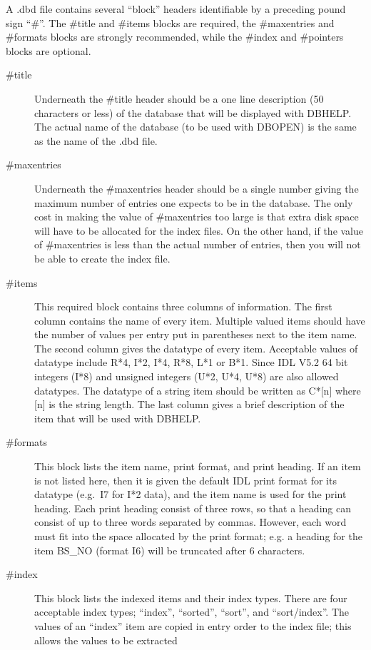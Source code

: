 A .dbd file contains several ``block'' headers identifiable by a 
preceding pound sign ``\#''.  The \#title and \#items blocks are
required, the \#maxentries and \#formats blocks are strongly recommended,
while the \#index and \#pointers blocks are optional.
\begin{description}
\item [\#title] Underneath the \#title header should be a one line description
(50 characters or less) of the database that will be displayed with
DBHELP.  The actual name of the database (to be used with DBOPEN) is the
same as the name of the .dbd file.   
\item [\#maxentries] Underneath the \#maxentries header should be a single
number giving the maximum number of entries one expects to be in the database.
The only cost in making the value of \#maxentries too large is that extra
disk space will have to be allocated for the index files.   On the other
hand, if the value of \#maxentries is less than the actual number of entries,   
then you will not be able to create the index file.
\item [\#items]  This required block contains three columns of information.
The first column contains the name of every item.  Multiple valued items
should have the number of values per entry put in parentheses next to the
item name.
The second column
gives the datatype of every item.  Acceptable values of datatype include
R*4, I*2, I*4, R*8, L*1 or B*1.   Since IDL V5.2 64 bit integers (I*8) and
unsigned integers (U*2, U*4, U*8) are also allowed datatypes. The datatype 
of a string item should be
written as C*[n] where [n] is the string length.  The last column
gives a brief description of the item that will be used with DBHELP.
\item [\#formats] This block lists the item name, print format, and print
heading.  If an item is not listed here, then it is given the default
IDL print format for its datatype (e.g.\ I7 for I*2 data), and the item
name is used for the print heading.  Each print heading consist of three
rows, so that a heading can consist of up to three words separated by
commas.   However, each word must fit into the space allocated by the
print format; e.g. a heading for the item BS\_NO (format I6) will be
truncated after 6 characters.
\item [\#index]  
This block lists the indexed items and their index types.    
There are four acceptable index types; ``index'', ``sorted'',
``sort'', and ``sort/index''.   
The values of an ``index'' item are copied in 
entry order to the index file; this allows the values to be extracted

\end{description}

